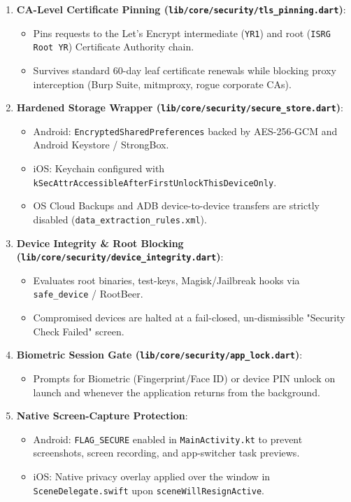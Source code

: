 \documentclass[11pt,a4paper]{article}
\begin{document}
\begin{enumerate}[leftmargin=1.4em,itemsep=3pt]
  \item \textbf{CA-Level Certificate Pinning (\texttt{lib/core/security/tls\_pinning.dart})}:
  \begin{itemize}[leftmargin=1.2em,itemsep=2pt]
    \item Pins requests to the Let's Encrypt intermediate (\texttt{YR1}) and root (\texttt{ISRG Root YR}) Certificate Authority chain.
    \item Survives standard 60-day leaf certificate renewals while blocking proxy interception (Burp Suite, mitmproxy, rogue corporate CAs).
  \end{itemize}
  \item \textbf{Hardened Storage Wrapper (\texttt{lib/core/security/secure\_store.dart})}:
  \begin{itemize}[leftmargin=1.2em,itemsep=2pt]
    \item Android: \texttt{EncryptedSharedPreferences} backed by AES-256-GCM and Android Keystore / StrongBox.
    \item iOS: Keychain configured with \texttt{kSecAttrAccessibleAfterFirstUnlockThisDeviceOnly}.
    \item OS Cloud Backups and ADB device-to-device transfers are strictly disabled (\texttt{data\_extraction\_rules.xml}).
  \end{itemize}
  \item \textbf{Device Integrity \& Root Blocking (\texttt{lib/core/security/device\_integrity.dart})}:
  \begin{itemize}[leftmargin=1.2em,itemsep=2pt]
    \item Evaluates root binaries, test-keys, Magisk/Jailbreak hooks via \texttt{safe\_device} / RootBeer.
    \item Compromised devices are halted at a fail-closed, un-dismissible "Security Check Failed" screen.
  \end{itemize}
  \item \textbf{Biometric Session Gate (\texttt{lib/core/security/app\_lock.dart})}:
  \begin{itemize}[leftmargin=1.2em,itemsep=2pt]
    \item Prompts for Biometric (Fingerprint/Face ID) or device PIN unlock on launch and whenever the application returns from the background.
  \end{itemize}
  \item \textbf{Native Screen-Capture Protection}:
  \begin{itemize}[leftmargin=1.2em,itemsep=2pt]
    \item Android: \texttt{FLAG\_SECURE} enabled in \texttt{MainActivity.kt} to prevent screenshots, screen recording, and app-switcher task previews.
    \item iOS: Native privacy overlay applied over the window in \texttt{SceneDelegate.swift} upon \texttt{sceneWillResignActive}.
  \end{itemize}
\end{enumerate}
\end{document}
